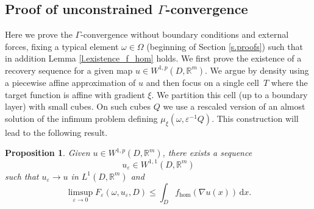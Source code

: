 \documentclass[10pt]{amsart}
\newtheorem{proposition}[theorem]{Proposition}
\theoremstyle{definition}
\let\e\varepsilon
\let\w\omega
\newcommand{\R}{\mathbb{R}}
\begin{document}
\subsection{Proof of unconstrained \texorpdfstring{$\Gamma$}{}-convergence}
Here we prove the $\Gamma$-convergence without boundary conditions and external forces, fixing a typical element $\w\in\Omega$ (\cf beginning of Section \ref{s.proofs}) such that in addition Lemma \ref{l.existence_f_hom} holds. We first prove the existence of a recovery sequence for a given map $u\in W^{1,p}(D,\R^m)$. We argue by density using a piecewise affine approximation of $u$ and then focus on a single cell~$T$ where the target function is affine with gradient $\xi$. We partition this cell (up to a boundary layer) with small cubes. On such cubes $Q$ we use a rescaled version of an almost solution of the infimum problem defining $\mu_{\xi}(\w,\e^{-1}Q)$. This construction will lead to the following result.
\begin{proposition}\label{p.ub}
Given $u\in W^{1,p}(D,\R^m)$, there exists a sequence
\[
u_{\e}\in W^{1,1}(D,\R^m)
\]
such that $u_{\e}\to u$ in $L^1(D,\R^m)$ and
\begin{equation*}
\limsup_{\e\to 0}F_{\e}(\w,u_{\e},D)\leq \int_D f_{\hom}(\nabla u(x))\,\mathrm{d}x.
\end{equation*}
\end{proposition}
\end{document}
